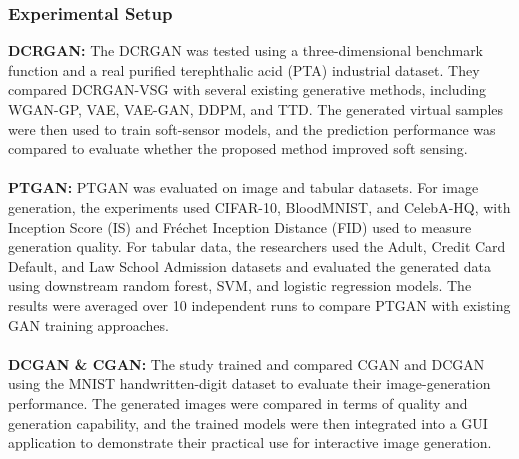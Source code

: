 \documentclass[12pt,a4paper]{article}
\begin{document}
\subsubsection{Experimental Setup}
\textbf{DCRGAN:} The DCRGAN was tested using a three-dimensional benchmark function and a real purified terephthalic acid (PTA) industrial dataset. They compared DCRGAN-VSG with several existing generative methods, including WGAN-GP, VAE, VAE-GAN, DDPM, and TTD. The generated virtual samples were then used to train soft-sensor models, and the prediction performance was compared to evaluate whether the proposed method improved soft sensing. \\
\\ \textbf{PTGAN:} PTGAN was evaluated on image and tabular datasets. For image generation, the experiments used CIFAR-10, BloodMNIST, and CelebA-HQ, with Inception Score (IS) and Fréchet Inception Distance (FID) used to measure generation quality. For tabular data, the researchers used the Adult, Credit Card Default, and Law School Admission datasets and evaluated the generated data using downstream random forest, SVM, and logistic regression models. The results were averaged over 10 independent runs to compare PTGAN with existing GAN training approaches. \\
\\ \textbf{DCGAN \& CGAN:} The study trained and compared CGAN and DCGAN using the MNIST handwritten-digit dataset to evaluate their image-generation performance. The generated images were compared in terms of quality and generation capability, and the trained models were then integrated into a GUI application to demonstrate their practical use for interactive image generation.
\end{document}
